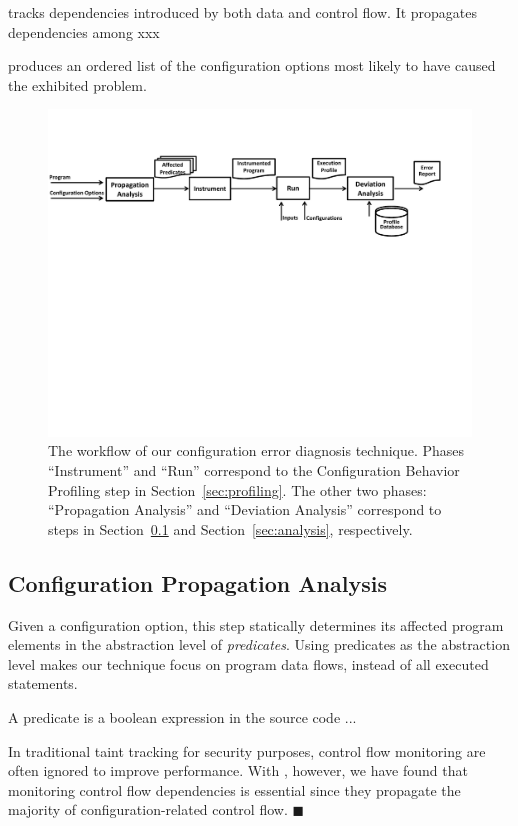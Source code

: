 \ourtool tracks dependencies introduced by both data and
control flow. It propagates dependencies among xxx

\ourtool produces an ordered list of the 
configuration options most likely to have caused the exhibited
problem.

\begin{figure}[!]
  \centering
  \includegraphics[scale=0.600]{architecture}
  \vspace*{-2.0ex}\caption {{\label{fig:workflow} The workflow of our configuration error diagnosis technique.
Phases ``Instrument'' and ``Run'' correspond to the Configuration Behavior Profiling step in Section~\ref{sec:profiling}.
The other two phases: ``Propagation Analysis'' and ``Deviation Analysis'' correspond to steps in Section~\ref{sec:prop} and Section~\ref{sec:analysis}, respectively.
}}
\end{figure}

\subsection{Configuration Propagation Analysis}
\label{sec:prop}

Given a configuration option, this step statically determines its affected program
elements in the abstraction level of \textit{predicates}. Using predicates
as the abstraction level makes our technique focus on program data flows, instead
of all executed statements.

A predicate is a boolean expression in the source code ...

In traditional taint tracking for security purposes, control
flow monitoring are often ignored to improve performance.
With \ourtool, however, we have found that monitoring control flow
dependencies is essential since they propagate the majority of
configuration-related control flow. $\blacksquare$


